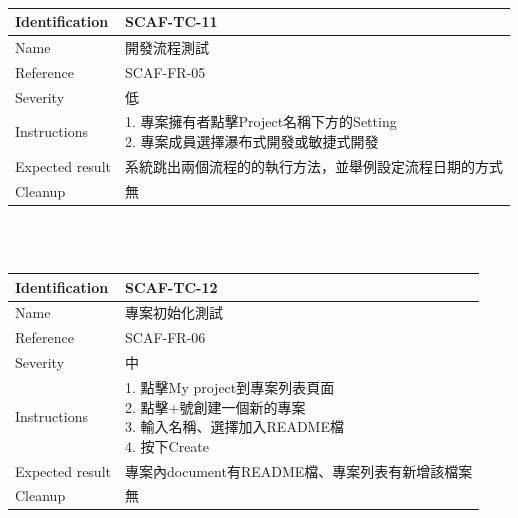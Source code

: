 \documentclass{report}
\begin{document}
\newline
\\
\begin{tabularx}{\textwidth}{
  |p{}%
  |p{}|%
  }
  \hline
  \centering Identification &  SCAF-TC-11 \\
  \hline
  \centering Name & 開發流程測試 \\
  \hline
  \centering Reference & SCAF-FR-05 \\
  \hline
  \centering Severity & 低 \\
  \hline
  \centering Instructions & 
  \makecell[l]{
    1. 專案擁有者點擊Project名稱下方的Setting \\
    2. 專案成員選擇瀑布式開發或敏捷式開發 \\
  }\\
  \hline
  \centering Expected result & 系統跳出兩個流程的的執行方法，並舉例設定流程日期的方式 \\
  \hline
  \centering Cleanup & 無 \\
  \hline
\end{tabularx}
\\
\newline
\\
\begin{tabularx}{\textwidth}{
  |p{}%
  |p{}|%
  }
  \hline
  \centering Identification &  SCAF-TC-12 \\
  \hline
  \centering Name & 專案初始化測試 \\
  \hline
  \centering Reference & SCAF-FR-06 \\
  \hline
  \centering Severity & 中 \\
  \hline
  \centering Instructions & 
  \makecell[l]{
    1. 點擊My project到專案列表頁面  \\
    2. 點擊+號創建一個新的專案  \\
    3. 輸入名稱、選擇加入README檔  \\
    4. 按下Create
  }\\
  \hline
  \centering Expected result & 專案內document有README檔、專案列表有新增該檔案 \\
  \hline
  \centering Cleanup & 無 \\
  \hline
\end{tabularx}
\\
\newline
\\
\end{document}
